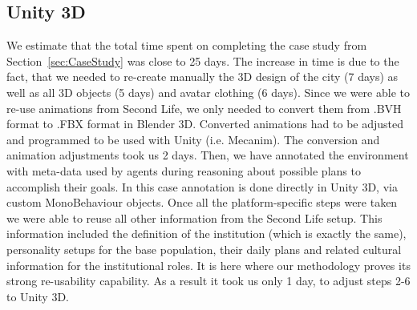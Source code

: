 \documentclass[graybox]{svmult}
\begin{document}



\subsection{Unity 3D}

We estimate that the total time spent on completing the case study from Section~\ref{sec:CaseStudy} was close to 25 days. The increase in time is due to the fact, that we needed to re-create manually the 3D design of the city (7 days) as well as all 3D objects (5 days) and avatar clothing (6 days). Since we were able to re-use animations from Second Life, we only needed to convert them from .BVH format to .FBX format in Blender 3D. Converted animations had to be adjusted and programmed to be used with Unity (i.e. Mecanim). The conversion and animation adjustments took us 2 days. Then, we have annotated the environment with meta-data used by agents during reasoning about possible plans to accomplish their goals. In this case annotation is done directly in Unity 3D, via custom MonoBehaviour objects. Once all the platform-specific steps were taken we were able to reuse all other information from the Second Life setup. This information included the definition of the institution (which is exactly the same), personality setups for the base population, their daily plans and related cultural information for the institutional roles. It is here where our methodology proves its strong re-usability capability. As a result it took us only 1 day, to adjust steps 2-6 to Unity 3D.
\end{document}
